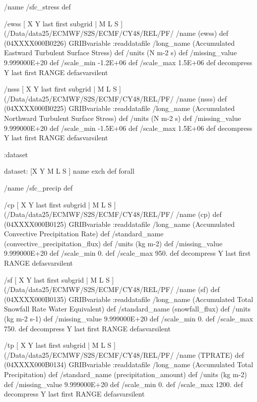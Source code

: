 \begin{ingrid}
/name /sfc_stress def

/ewss { [ X Y last first subgrid | M L S ] (/Data/data25/ECMWF/S2S/ECMF/CY48/REL/PF/%
/name (ewss) def
(04XXXX000B0226) GRIBvariable
:readdatafile
/long_name (Accumulated Eastward Turbulent Surface Stress) def
/units (N m-2 s) def
/missing_value 9.999000E+20 def
/scale_min -1.2E+06 def
/scale_max 1.5E+06 def
decompress
Y last first RANGE
} defasvarsilent

/nsss { [ X Y last first subgrid | M L S ] (/Data/data25/ECMWF/S2S/ECMF/CY48/REL/PF/%
/name (nsss) def
(04XXXX000B0225) GRIBvariable
:readdatafile
/long_name (Accumulated Northward Turbulent Surface Stress) def
/units (N m-2 s) def
/missing_value 9.999000E+20 def
/scale_min -1.5E+06 def
/scale_max 1.5E+06 def
decompress
Y last first RANGE
} defasvarsilent


:dataset

dataset:
[X Y M L S ] {name exch def } forall

/name /sfc_precip def

/cp { [ X Y last first subgrid | M L S ] (/Data/data25/ECMWF/S2S/ECMF/CY48/REL/PF/%
/name (cp) def
(04XXXX000B0125) GRIBvariable
:readdatafile
/long_name (Accumulated Convective Precipitation Rate) def
/standard_name (convective_precipitation_flux) def
/units (kg m-2) def
/missing_value 9.999000E+20 def
/scale_min 0. def
/scale_max 950. def
decompress
Y last first RANGE
} defasvarsilent

/sf { [ X Y last first subgrid | M L S ] (/Data/data25/ECMWF/S2S/ECMF/CY48/REL/PF/%
/name (sf) def
(04XXXX000B0135) GRIBvariable
:readdatafile
/long_name (Accumulated Total Snowfall Rate Water Equivalent) def
/standard_name (snowfall_flux) def
/units (kg m-2 s-1) def
/missing_value 9.999000E+20 def
/scale_min 0. def
/scale_max 750. def
decompress
Y last first RANGE
} defasvarsilent

/tp { [ X Y last first subgrid | M L S ] (/Data/data25/ECMWF/S2S/ECMF/CY48/REL/PF/%
/name (TPRATE) def
(04XXXX000B0134) GRIBvariable
:readdatafile
/long_name (Accumulated Total Precipitation) def
/standard_name (precipitation_amount) def
/units (kg m-2) def
/missing_value 9.999000E+20 def
/scale_min 0. def
/scale_max 1200. def
decompress
Y last first RANGE
} defasvarsilent


\end{ingrid}
